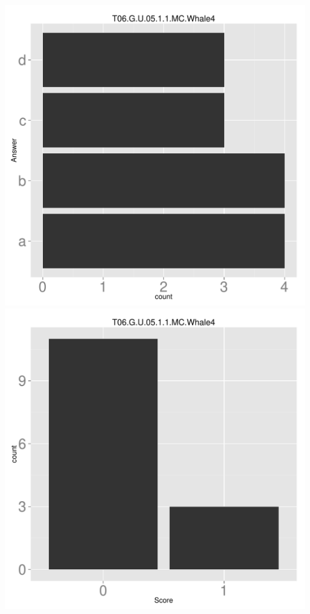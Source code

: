 \documentclass[12pt,nohyper]{tufte-handout}\usepackage[]{graphicx}\usepackage[]{color}
\begin{document}
\begin{center} \includegraphics[width=.45\linewidth]{Topic06_88_answer} \includegraphics[width=.45\linewidth]{Topic06_88_score} \end{center} 
\end{document}
